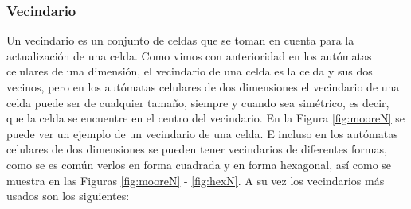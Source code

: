 \subsubsection{Vecindario}
    \label{sec:Vecindario}
    Un vecindario es un conjunto de celdas que se toman en cuenta para la actualizaci\'on de una celda. Como vimos con anterioridad
        en los aut\'omatas celulares de una dimensi\'on, el vecindario de una celda es la celda y sus dos vecinos, pero en los aut\'omatas
        celulares de dos dimensiones el vecindario de una celda puede ser de cualquier tama\~no, siempre y cuando sea sim\'etrico, es decir,
        que la celda se encuentre en el centro del vecindario. En la Figura \ref{fig:mooreN} se puede ver un ejemplo de un vecindario
        de una celda. E incluso en los aut\'omatas celulares de dos dimensiones se pueden tener vecindarios de diferentes formas, como se
        es com\'un verlos en forma cuadrada y en forma hexagonal, as\'i como se muestra en las Figuras \ref{fig:mooreN} - \ref{fig:hexN}.
    \vskip 0.5cm
    A su vez los vecindarios m\'as usados son los siguientes: 
